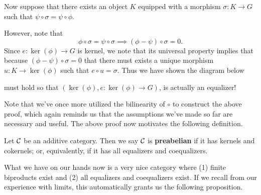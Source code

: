 \begin{prf}
    Now suppose that there exists an object $K$ equipped with a morphism $\sigma: K \to G$ such 
    that $\psi \circ \sigma = \psi \circ \phi$. 
    \begin{center}
    \end{center}
    However, note that 
    \[
        \phi \circ \sigma = \psi \circ \sigma 
        \implies 
        (\phi - \psi)\circ \sigma = 0.
    \]
    Since $e: \ker(\phi) \to G$ is kernel, we note that its 
    universal property implies that because $(\phi - \psi)\circ \sigma = 0$ 
    that there must exists a unique morphism $u: K \to \ker(\phi)$ such that 
    $e \circ u = \sigma$. Thus we have shown the diagram below 
    \begin{center}
    \end{center}
    must hold so that $(\ker(\phi), e: \ker(\phi) \to G)$, is actually an equalizer!
\end{prf}

Note that we've once more utilized the bilinearity of $\circ$ to construct the above proof, 
which again reminds us that the assumptions we've made so far are necessary and useful. The above proof now motivates 
the following definition.

\begin{definition}
    Let $\mathcal{C}$ be an additive category. Then we say $\mathcal{C}$ is \textbf{preabelian}
    if it has kernels and cokernels; or, equivalently, if it has all equalizers and coequalizers. 
\end{definition}

What we have on our hands now is a very nice category where (1) finite biproducts 
exist and (2) all equalizers and coequalizers exist. If we recall from our experience 
with limits, this automatically grants us the following proposition. 

